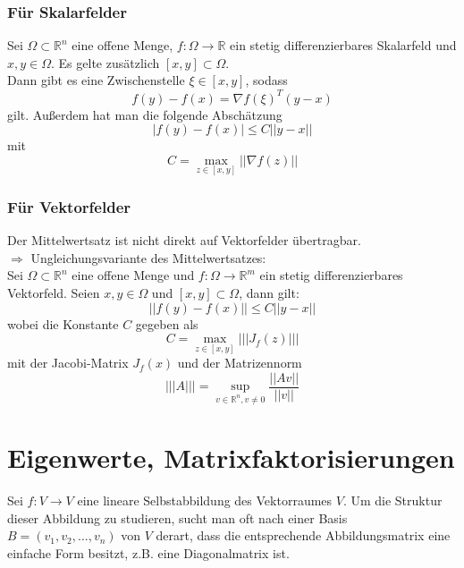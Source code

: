 \documentclass[a4paper,twocolumn,10pt]{article}
\begin{document}
\subsubsection{Für Skalarfelder}
Sei $\Omega\subset\mathbb{R}^n$ eine offene Menge, $f:\Omega\rightarrow\mathbb{R}$ ein stetig differenzierbares Skalarfeld und $x,y\in\Omega$. Es gelte zusätzlich $[x,y]\subset\Omega$.\\
Dann gibt es eine Zwischenstelle $\xi\in[x,y]$, sodass
\begin{equation*}
f(y)-f(x)=\nabla f(\xi)^T(y-x)
\end{equation*}
gilt. Außerdem hat man die folgende Abschätzung
\begin{equation*}
|f(y)-f(x)|\leq C||y-x||
\end{equation*}
mit
\begin{equation*}
C=\max\limits_{z\in [x,y]}||\nabla f(z)||
\end{equation*}

\subsubsection{Für Vektorfelder}
Der Mittelwertsatz ist nicht direkt auf Vektorfelder übertragbar.\\
$\Rightarrow$ Ungleichungsvariante des Mittelwertsatzes:\\
Sei $\Omega\subset\mathbb{R}^n$ eine offene Menge und $f:\Omega\rightarrow\mathbb{R}^m$ ein stetig differenzierbares Vektorfeld. Seien $x,y\in\Omega$ und $[x,y]\subset\Omega$, dann gilt:
\begin{equation*}
||f(y)-f(x)||\leq C||y-x||
\end{equation*}
wobei die Konstante $C$ gegeben als
\begin{equation*}
C=\max\limits_{z\in [x,y]}|||J_f(z)|||
\end{equation*}
mit der Jacobi-Matrix $J_f(x)$ und der Matrizennorm
\begin{equation*}
|||A|||=\sup\limits_{v\in\mathbb{R}^n,v\neq 0}\frac{||Av||}{||v||}
\end{equation*}

\section{Eigenwerte, Matrixfaktorisierungen}
Sei $f:V\rightarrow V$ eine lineare Selbstabbildung des Vektorraumes $V$. Um die Struktur dieser Abbildung zu studieren, sucht man oft nach einer Basis $B=(v_1,v_2,...,v_n)$ von $V$ derart, dass die entsprechende Abbildungsmatrix eine einfache Form besitzt, z.B. eine Diagonalmatrix ist.
\end{document}
